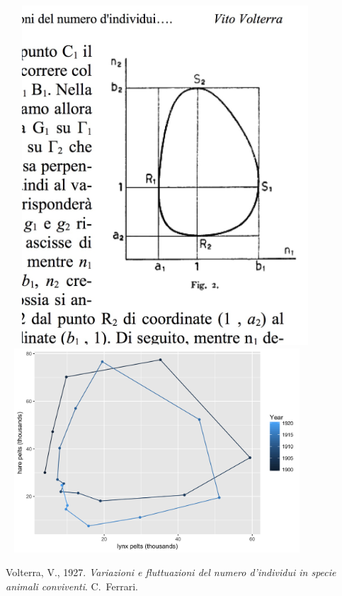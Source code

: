\documentclass[10pt]{report}
\begin{document}
\begin{minipage}[t]{0.3\textwidth}
\mbox{ }
\vspace*{0.5in}
\mbox{ } \hfill
\includegraphics[width=0.8\textwidth]{img/volterra-orbit.jpg}
\\[-8pt]
\mbox{ }
\hfill
\includegraphics[width=0.8\textwidth]{img/hare-lynx-pelts-2.png}
\end{minipage}
\vfill
\hfill
{\tiny
Volterra, V., 1927. {\slshape Variazioni
e fluttuazioni del numero d'individui in specie animali
conviventi}. C.~Ferrari.
}

\end{document}
